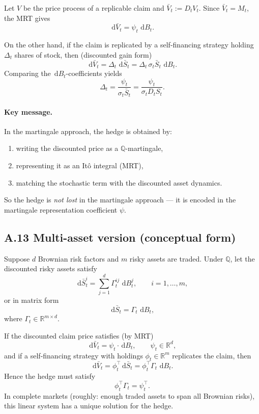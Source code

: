 \documentclass[11pt]{article}
\newcommand{\Qbb}{\mathbb{Q}}
\newcommand{\R}{\mathbb{R}}
\newcommand{\dd}{\,\mathrm{d}}
\newcommand{\1}{\mathbf{1}}
\begin{document}
Let \(V\) be the price process of a replicable claim and \(\bar V_t:=D_tV_t\).
Since \(\bar V_t=M_t\), the MRT gives
$$
\dd \bar V_t=\psi_t\,\dd B_t.
$$

On the other hand, if the claim is replicated by a self-financing strategy holding \(\Delta_t\) shares of stock, then (discounted gain form)
$$
\dd \bar V_t=\Delta_t\,\dd \bar S_t
=\Delta_t\,\sigma_t \bar S_t\,\dd B_t.
$$
Comparing the \(\dd B_t\)-coefficients yields
$$
\boxed{\ \Delta_t=\frac{\psi_t}{\sigma_t \bar S_t}
=\frac{\psi_t}{\sigma_t D_t S_t}. \ }
$$

\paragraph{Key message.}
In the martingale approach, the hedge is obtained by:
\begin{enumerate}[leftmargin=1.6em]
    \item writing the discounted price as a \(\Qbb\)-martingale,
    \item representing it as an It\^o integral (MRT),
    \item matching the stochastic term with the discounted asset dynamics.
\end{enumerate}

So the hedge is \emph{not lost} in the martingale approach --- it is encoded in the martingale representation coefficient \(\psi\).

\subsection*{A.13 Multi-asset version (conceptual form)}

Suppose \(d\) Brownian risk factors and \(m\) risky assets are traded.
Under \(\Qbb\), let the discounted risky assets satisfy
$$
\dd \bar S_t^i = \sum_{j=1}^d \Gamma_t^{ij}\,\dd B_t^j,
\qquad i=1,\dots,m,
$$
or in matrix form
$$
\dd \bar S_t = \Gamma_t\,\dd B_t,
$$
where \(\Gamma_t\in\R^{m\times d}\).

If the discounted claim price satisfies (by MRT)
$$
\dd \bar V_t=\psi_t\cdot \dd B_t,
\qquad \psi_t\in\R^d,
$$
and if a self-financing strategy with holdings \(\phi_t\in\R^m\) replicates the claim, then
$$
\dd \bar V_t=\phi_t^\top \dd \bar S_t
=\phi_t^\top \Gamma_t\,\dd B_t.
$$
Hence the hedge must satisfy
$$
\boxed{\ \phi_t^\top \Gamma_t=\psi_t^\top. \ }
$$
In complete markets (roughly: enough traded assets to span all Brownian risks), this linear system has a unique solution for the hedge.
\end{document}
